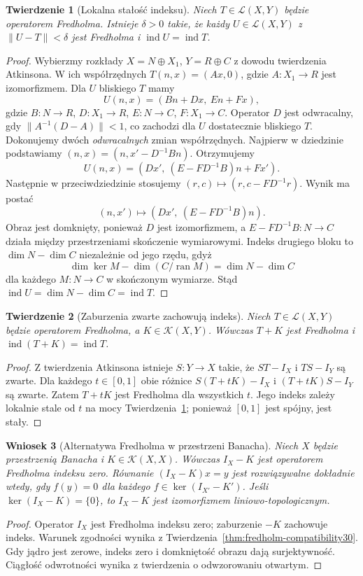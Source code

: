 \documentclass[11pt,a4paper]{article}
\numberwithin{equation}{section}
\theoremstyle{plain}
\newtheorem{twierdzenie}{Twierdzenie}[section]
\newtheorem{wniosek}[twierdzenie]{Wniosek}
\theoremstyle{definition}
\theoremstyle{remark}
\begin{document}
\begin{twierdzenie}[Lokalna stałość indeksu]
\label{thm:index-local30}
Niech $T\in\mathcal L(X,Y)$ będzie operatorem Fredholma.
Istnieje $\delta>0$ takie, że każdy $U\in\mathcal L(X,Y)$
z $\|U-T\|<\delta$ jest Fredholma i
$\operatorname{ind}U=\operatorname{ind}T$.
\end{twierdzenie}
\begin{proof}
Wybierzmy rozkłady $X=N\oplus X_1$, $Y=R\oplus C$
z dowodu twierdzenia Atkinsona. W ich współrzędnych
$T(n,x)=(Ax,0)$, gdzie $A:X_1\to R$ jest izomorfizmem.
Dla $U$ bliskiego $T$ mamy
\[U(n,x)=(Bn+Dx,\ En+Fx),\]
gdzie $B:N\to R$, $D:X_1\to R$, $E:N\to C$,
$F:X_1\to C$. Operator $D$ jest odwracalny, gdy
$\|A^{-1}(D-A)\|<1$, co zachodzi dla $U$ dostatecznie
bliskiego $T$.
Dokonujemy dwóch \emph{odwracalnych} zmian współrzędnych.
Najpierw w dziedzinie podstawiamy
$(n,x)=(n,x'-D^{-1}Bn)$. Otrzymujemy
\[U(n,x)=(Dx',\ (E-FD^{-1}B)n+Fx').\]
Następnie w przeciwdziedzinie stosujemy
$(r,c)\mapsto(r,c-FD^{-1}r)$. Wynik ma postać
\[(n,x')\mapsto(Dx',\ (E-FD^{-1}B)n).\]
Obraz jest domknięty, ponieważ $D$ jest izomorfizmem,
a $E-FD^{-1}B:N\to C$ działa między przestrzeniami
skończenie wymiarowymi. Indeks drugiego bloku to
$\dim N-\dim C$ niezależnie od jego rzędu, gdyż
\[\dim\ker M-\dim(C/\operatorname{ran}M)=\dim N-\dim C\]
dla każdego $M:N\to C$ w skończonym wymiarze.
Stąd $\operatorname{ind}U=\dim N-\dim C=\operatorname{ind}T$.
\end{proof}

\begin{twierdzenie}[Zaburzenia zwarte zachowują indeks]
\label{thm:index-compact-perturb30}
Niech $T\in\mathcal L(X,Y)$ będzie operatorem Fredholma,
a $K\in\mathcal K(X,Y)$. Wówczas $T+K$ jest Fredholma i
$\operatorname{ind}(T+K)=\operatorname{ind}T$.
\end{twierdzenie}
\begin{proof}
Z twierdzenia Atkinsona istnieje $S:Y\to X$ takie, że
$ST-I_X$ i $TS-I_Y$ są zwarte. Dla każdego $t\in[0,1]$
obie różnice $S(T+tK)-I_X$ i $(T+tK)S-I_Y$ są zwarte.
Zatem $T+tK$ jest Fredholma dla wszystkich $t$.
Jego indeks zależy lokalnie stale od $t$ na mocy
Twierdzenia~\ref{thm:index-local30}; ponieważ $[0,1]$
jest spójny, jest stały.
\end{proof}

\begin{wniosek}[Alternatywa Fredholma w przestrzeni Banacha]
\label{cor:fredholm-banach30}
Niech $X$ będzie przestrzenią Banacha i
$K\in\mathcal K(X,X)$. Wówczas $I_X-K$ jest operatorem
Fredholma indeksu zero. Równanie $(I_X-K)x=y$ jest
rozwiązywalne dokładnie wtedy, gdy $f(y)=0$ dla każdego
$f\in\ker(I_{X'}-K')$. Jeśli $\ker(I_X-K)=\{0\}$,
to $I_X-K$ jest izomorfizmem liniowo-topologicznym.
\end{wniosek}
\begin{proof}
Operator $I_X$ jest Fredholma indeksu zero; zaburzenie
$-K$ zachowuje indeks. Warunek zgodności wynika z
Twierdzenia~\ref{thm:fredholm-compatibility30}. Gdy jądro
jest zerowe, indeks zero i domkniętość obrazu dają
surjektywność. Ciągłość odwrotności wynika z twierdzenia
o odwzorowaniu otwartym.
\end{proof}
\end{document}
